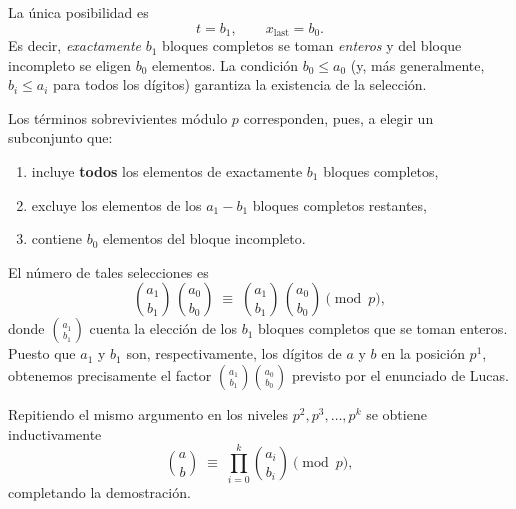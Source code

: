 \documentclass{article}
\begin{document}
\noindent
La única posibilidad es
\[
  t=b_1,\qquad x_{\text{last}}=b_0.
\]
Es decir, \emph{exactamente} $b_1$ bloques completos se toman
\emph{enteros} y del bloque incompleto se eligen $b_0$ elementos.
La condición $b_0\le a_0$ (y, más generalmente, $b_i\le a_i$ para
todos los dígitos) garantiza la existencia de la selección.

Los términos sobrevivientes módulo $p$ corresponden, pues, a elegir un
subconjunto que:
\begin{enumerate}
  \item incluye \textbf{todos} los elementos de exactamente $b_1$ bloques
        completos,
  \item excluye los elementos de los $a_1-b_1$ bloques completos restantes,
  \item contiene $b_0$ elementos del bloque incompleto.
\end{enumerate}

\medskip
\noindent
El número de tales selecciones es
\[
  \binom{a_1}{b_1}\,\binom{a_0}{b_0}
  \;\equiv\;
  \binom{a_1}{b_1}\,\binom{a_0}{b_0}
  \pmod{p},
\]
donde $\binom{a_1}{b_1}$ cuenta la elección de los $b_1$ bloques completos
que se toman enteros.  
Puesto que $a_1$ y $b_1$ son, respectivamente, los dígitos de $a$ y $b$
en la posición $p^1$, obtenemos precisamente el factor
$\binom{a_1}{b_1}\binom{a_0}{b_0}$ previsto por el enunciado de Lucas.

Repitiendo el mismo argumento en los niveles $p^2,p^3,\dots,p^k$ se
obtiene inductivamente
\[
  \binom{a}{b}
  \;\equiv\;
  \prod_{i=0}^{k}
  \binom{a_i}{b_i}
  \pmod{p},
\]
completando la demostración.
\end{document}
